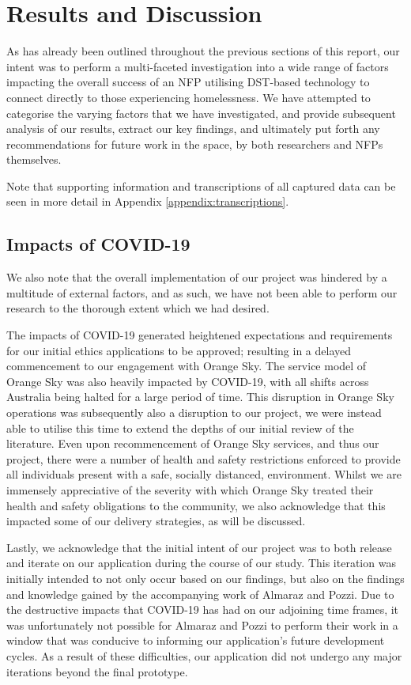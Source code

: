 \chapter{Results and Discussion}

As has already been outlined throughout the previous sections of this report, our intent was to perform a multi-faceted investigation into a wide range of factors impacting the overall success of an NFP utilising DST-based technology to connect directly to those experiencing homelessness. We have attempted to categorise the varying factors that we have investigated, and provide subsequent analysis of our results, extract our key findings, and ultimately put forth any recommendations for future work in the space, by both researchers and NFPs themselves.

Note that supporting information and transcriptions of all captured data can be seen in more detail in Appendix \ref{appendix:transcriptions}.

\section{Impacts of COVID-19}

We also note that the overall implementation of our project was hindered by a multitude of external factors, and as such, we have not been able to perform our research to the thorough extent which we had desired.

The impacts of COVID-19 generated heightened expectations and requirements for our initial ethics applications to be approved; resulting in a delayed commencement to our engagement with Orange Sky. The service model of Orange Sky was also heavily impacted by COVID-19, with all shifts across Australia being halted for a large period of time. This disruption in Orange Sky operations was subsequently also a disruption to our project, we were instead able to utilise this time to extend the depths of our initial review of the literature. Even upon recommencement of Orange Sky services, and thus our project, there were a number of health and safety restrictions enforced to provide all individuals present with a safe, socially distanced, environment. Whilst we are immensely appreciative of the severity with which Orange Sky treated their health and safety obligations to the community, we also acknowledge that this impacted some of our delivery strategies, as will be discussed.

Lastly, we acknowledge that the initial intent of our project was to both release and iterate on our application during the course of our study. This iteration was initially intended to not only occur based on our findings, but also on the findings and knowledge gained by the accompanying work of Almaraz and Pozzi. Due to the destructive impacts that COVID-19 has had on our adjoining time frames, it was unfortunately not possible for Almaraz and Pozzi to perform their work in a window that was conducive to informing our application's future development cycles. As a result of these difficulties, our application did not undergo any major iterations beyond the final prototype.

